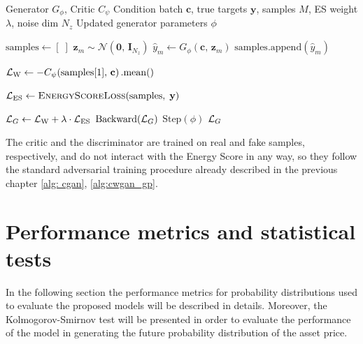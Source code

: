 \begin{algorithm}[H]
\caption{{\color{wganred}\texttt{ForWGAN}} --- hybrid generator update}
\begin{algorithmic}[1]
\REQUIRE Generator $G_{\phi}$, Critic $C_{\psi}$
\REQUIRE Condition batch $\mathbf{c}$, true targets $\mathbf{y}$,
         samples $M$, ES weight $\lambda$, noise dim $N_z$
\ENSURE  Updated generator parameters $\phi$
 
 
\STATE $\mathrm{samples} \leftarrow [\;]$
  \STATE $\mathbf{z}_m \sim \mathcal{N}(\mathbf{0},\,\mathbf{I}_{N_z})$
  \STATE $\hat{y}_m \leftarrow G_{\phi}(\mathbf{c},\,\mathbf{z}_m)$
  \STATE $\mathrm{samples}.\mathrm{append}(\hat{y}_m)$
\ENDFOR
 
\STATE $\mathcal{L}_{\mathrm{W}}
  \leftarrow
  -C_{\psi}\!\left(\mathrm{samples}[1],\,\mathbf{c}\right).\mathrm{mean}()$
 
\STATE $\mathcal{L}_{\mathrm{ES}}
  \leftarrow
  \textsc{EnergyScoreLoss}(\mathrm{samples},\;\mathbf{y})$
 
\STATE $\mathcal{L}_{G}
  \leftarrow \mathcal{L}_{\mathrm{W}} + \lambda \cdot \mathcal{L}_{\mathrm{ES}}$
\STATE $\mathrm{Backward}(\mathcal{L}_{G})$
\STATE $\mathrm{Step}(\phi)$
\RETURN $\mathcal{L}_{G}$
\end{algorithmic}
\end{algorithm}
 

The critic and the discriminator are trained on real and fake samples, respectively, and do not interact with the Energy Score in any way,
so they follow the standard adversarial training procedure already described in the previous chapter \ref{alg: cgan}, \ref{alg:cwgan_gp}.



\section{Performance metrics and statistical tests}
\label{sec:performance_metrics}
In the following section the performance metrics for probability distributions used to evaluate the proposed models will be described in details.
Moreover, the Kolmogorov-Smirnov test will be presented in order to evaluate the performance of the model in generating the future probability distribution of the asset price.\\
